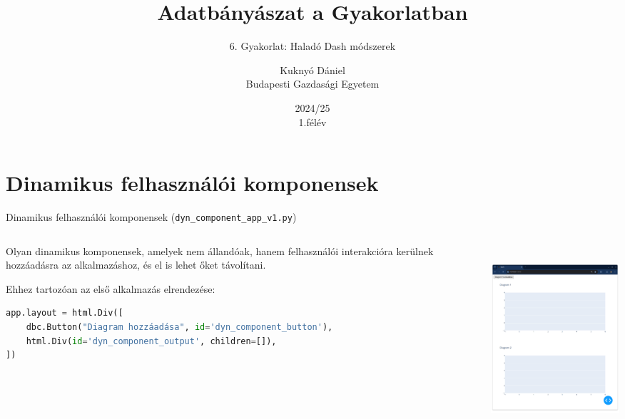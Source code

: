 \documentclass[english, aspectratio=169]{beamer}
\makeatletter
\newcommand\makebeamertitle{\frame{\maketitle}}
\let\origtableofcontents=\tableofcontents
\def\tableofcontents{\@ifnextchar[{\origtableofcontents}{\gobbletableofcontents}}
\def\gobbletableofcontents#1{\origtableofcontents}
\makeatother
\begin{document}
	\section{Dinamikus felhasználói komponensek}
	\title[]{Adatbányászat a Gyakorlatban}
	\subtitle{6. Gyakorlat: Haladó Dash módszerek}
	\author[Kuknyó Dániel]{Kuknyó Dániel\\Budapesti Gazdasági Egyetem}
	\date{2024/25\\1.félév}
	\makebeamertitle
	
	\begin{frame}
	\tableofcontents{}
	\end{frame}
	
	\begin{frame}
	\tableofcontents[currentsection]
	\end{frame}
	
	\begin{frame}[fragile]{Dinamikus felhasználói komponensek (\texttt{dyn\_component\_app\_v1.py})}
		\begin{columns}
			\begin{column}{.5\textwidth}
				Olyan dinamikus komponensek, amelyek nem állandóak, hanem felhasználói interakcióra kerülnek hozzáadásra az alkalmazáshoz, és el is lehet őket távolítani.\par\smallskip
				Ehhez tartozóan az első alkalmazás elrendezése:\par\smallskip
				\begin{lstlisting}[language=python]
app.layout = html.Div([
	dbc.Button("Diagram hozzáadása", id='dyn_component_button'),
	html.Div(id='dyn_component_output', children=[]),
])
				\end{lstlisting}
			\end{column}
			\begin{column}{.5\textwidth}
				\begin{center}
					\includegraphics[width=7cm, height=7cm, keepaspectratio]{images/adv_1.png}
				\end{center}
			\end{column}
		\end{columns}
	\end{frame}
	
\end{document}
